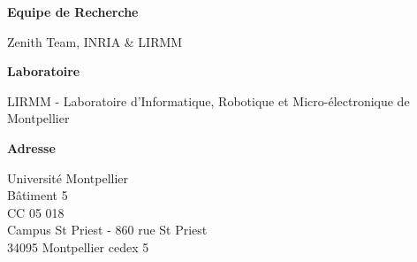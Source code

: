 
{
\small

\newcommand{\addrsection}[1]{%
  \vspace{10mm}
  {\noindent\normalfont\large\bfseries #1}
	\vspace{2mm}
}

\addrsection{Equipe de Recherche}

\noindent Zenith Team, INRIA \& LIRMM

\addrsection{Laboratoire}

\noindent LIRMM - Laboratoire d'Informatique, Robotique et Micro-électronique de Montpellier

\addrsection{Adresse}

\noindent Université Montpellier\\
Bâtiment 5\\
CC 05 018 \\
Campus St Priest - 860 rue St Priest \\
34095 Montpellier cedex 5



}

